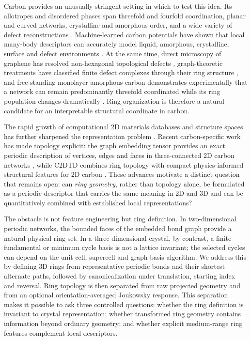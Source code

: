 \documentclass[twoside,twocolumn,9pt]{article}
\begin{document}
Carbon provides an unusually stringent setting in which to test this idea. Its allotropes and disordered phases span threefold and fourfold coordination, planar and curved networks, crystalline and amorphous order, and a wide variety of defect reconstructions \cite{Robertson2002,Hoffmann2016}. Machine-learned carbon potentials have shown that local many-body descriptors can accurately model liquid, amorphous, crystalline, surface and defect environments \cite{Deringer2017,Rowe2020}. At the same time, direct microscopy of graphene has resolved non-hexagonal topological defects \cite{Meyer2008}, graph-theoretic treatments have classified finite defect complexes through their ring structure \cite{Cockayne2012}, and free-standing monolayer amorphous carbon demonstrates experimentally that a network can remain predominantly threefold coordinated while its ring population changes dramatically \cite{Toh2020}. Ring organization is therefore a natural candidate for an interpretable structural coordinate in carbon.

The rapid growth of computational 2D materials databases and structure spaces has further sharpened the representation problem \cite{Mounet2018,Haastrup2018}. Recent carbon-specific work has made topology explicit: the graph embedding tensor provides an exact periodic description of vertices, edges and faces in three-connected 2D carbon networks \cite{Macmillan2026}, while C2DTD combines ring topology with compact physics-informed structural features for 2D carbon \cite{Hawthorne2026}. These advances motivate a distinct question that remains open: can \emph{ring geometry}, rather than topology alone, be formulated as a periodic descriptor that carries the same meaning in 2D and 3D and can be quantitatively combined with established local representations?

The obstacle is not feature engineering but ring definition. In two-dimensional periodic networks, the bounded faces of the embedded bond graph provide a natural physical ring set. In a three-dimensional crystal, by contrast, a finite fundamental or minimum cycle basis is not a lattice invariant; the selected cycles can depend on the unit cell, supercell and graph-basis algorithm. We address this by defining 3D rings from representative periodic bonds and their shortest alternate paths, followed by canonicalization under translation, starting index and reversal. Ring topology is then separated from raw projected geometry and from an optional orientation-averaged Joukowsky response. This separation makes it possible to ask three controlled questions: whether the ring definition is invariant to crystal representation; whether transformed ring geometry contains information beyond ordinary geometry; and whether explicit medium-range ring features complement local descriptors.
\end{document}
